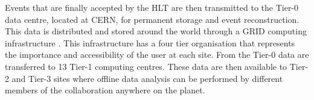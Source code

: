 Events that are finally accepted by the \ac{HLT} are then transmitted
to the Tier-0 data centre, located at CERN, for permanent storage and
event reconstruction. This data is distributed and stored around the
world through a GRID computing infrastructure \cite{Bayatyan:838359}.
This infrastructure has a four tier organisation that represents the importance
and accessibility of the user at each site. From the Tier-0 data are
transferred to 13 Tier-1 computing centres. These data are then
available to Tier-2 and Tier-3 sites where offline data analysis can be
performed by different members of the \CMS collaboration anywhere on
the planet.

